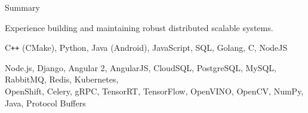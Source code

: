 \documentclass{resume}
\begin{document}
  \begin{rSection}{Summary}
    \begin{rSummary}
    {
      \item Experience building and maintaining robust distributed scalable systems.
      \item C\texttt{++} (CMake), Python, Java (Android), JavaScript, SQL, Golang, C, NodeJS
      \item Node.js, Django, Angular 2, AngularJS, CloudSQL, PostgreSQL, MySQL, RabbitMQ, Redis, Kubernetes,\\ OpenShift, Celery, gRPC, TensorRT, TensorFlow, OpenVINO, OpenCV, NumPy, Java, Protocol Buffers
    }
    \end{rSummary}
  \end{rSection}

  \vspace{-0.5em}
\end{document}
